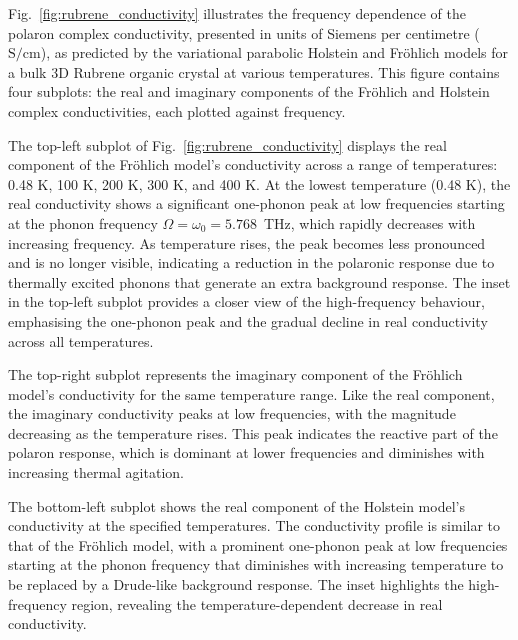 
Fig.~\ref{fig:rubrene_conductivity} illustrates the frequency dependence of the polaron complex conductivity, presented in units of Siemens per centimetre ($\text{S}/\text{cm}$), as predicted by the variational parabolic Holstein and Fr\"ohlich models for a bulk 3D Rubrene organic crystal at various temperatures. This figure contains four subplots: the real and imaginary components of the Fr\"ohlich and Holstein complex conductivities, each plotted against frequency.

The top-left subplot of Fig.~\ref{fig:rubrene_conductivity} displays the real component of the Fr\"ohlich model's conductivity across a range of temperatures: 0.48 K, 100 K, 200 K, 300 K, and 400 K. At the lowest temperature (0.48 K), the real conductivity shows a significant one-phonon peak at low frequencies starting at the phonon frequency $\Omega = \omega_0 = 5.768$~\si{THz}, which rapidly decreases with increasing frequency. As temperature rises, the peak becomes less pronounced and is no longer visible, indicating a reduction in the polaronic response due to thermally excited phonons that generate an extra background response. The inset in the top-left subplot provides a closer view of the high-frequency behaviour, emphasising the one-phonon peak and the gradual decline in real conductivity across all temperatures.

The top-right subplot represents the imaginary component of the Fr\"ohlich model's conductivity for the same temperature range. Like the real component, the imaginary conductivity peaks at low frequencies, with the magnitude decreasing as the temperature rises. This peak indicates the reactive part of the polaron response, which is dominant at lower frequencies and diminishes with increasing thermal agitation.

The bottom-left subplot shows the real component of the Holstein model's conductivity at the specified temperatures. The conductivity profile is similar to that of the Fr\"ohlich model, with a prominent one-phonon peak at low frequencies starting at the phonon frequency that diminishes with increasing temperature to be replaced by a Drude-like background response. The inset highlights the high-frequency region, revealing the temperature-dependent decrease in real conductivity.

